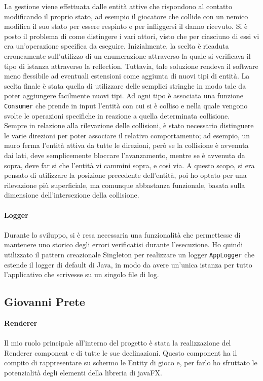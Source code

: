 \documentclass[a4paper,12pt]{report}
\begin{document}
La gestione viene effettuata dalle entità attive che rispondono al contatto modificando il proprio stato, ad esempio il giocatore che collide con un nemico modifica il suo stato per essere respinto e per infliggersi il danno ricevuto.
Si è posto il problema di come distingere i vari attori, visto che per ciasciuno di essi vi era un'operazione specifica da eseguire. Inizialmente, la scelta è ricaduta erroneamente sull'utilizzo di un enumerazione attraverso la quale si verificava il tipo di istanza attraverso la reflection. Tuttavia, tale soluzione rendeva il software meno flessibile ad eventuali estensioni come aggiunta di nuovi tipi di entità.
La scelta finale è stata quella di utilizzare delle semplici stringhe in modo tale da poter aggiungere facilmente nuovi tipi. Ad ogni tipo è associata una funzione \texttt{Consumer} che prende in input l'entità con cui si è colliso e nella quale vengono svolte le operazioni specifiche in reazione a quella determinata collisione.\\
Sempre in relazione alla rilevazione delle collisioni, è stato necessario distinguere le varie direzioni per poter associare il relativo comportamento; ad esempio, un muro ferma l'entità attiva da tutte le direzioni, però se la collisione è avvenuta dai lati, deve semplicemente bloccare l'avanzamento, mentre se è avvenuta da sopra, deve far si che l'entità vi cammini sopra, e così via.
A questo scopo, si era pensato di utilizzare la posizione precedente dell'entità, poi ho optato per una rilevazione più superficiale, ma comunque abbastanza funzionale, basata sulla dimensione dell'intersezione della collisione.\\
\\
\textbf{Logger}\\
\\
Durante lo sviluppo, si è resa necessaria una funzionalità che permettesse di mantenere uno storico degli errori verificatisi durante l'esecuzione. Ho quindi utilizzato il pattern creazionale Singleton per realizzare un logger \texttt{AppLogger} che estende il logger di default di Java, in modo da avere un'unica istanza per tutto l'applicativo che scrivesse su un singolo file di log.
\newpage
\subsection{Giovanni Prete}
\textbf{Renderer}\\
\\
Il mio ruolo principale all'interno del progetto è stata la realizzazione del Renderer component e di tutte le sue declinazioni.
Questo component ha il compito di rappresentare su schermo le Entity di gioco e, per farlo ho sfruttato le potenzialità degli elementi della libreria di javaFX.
\end{document}
